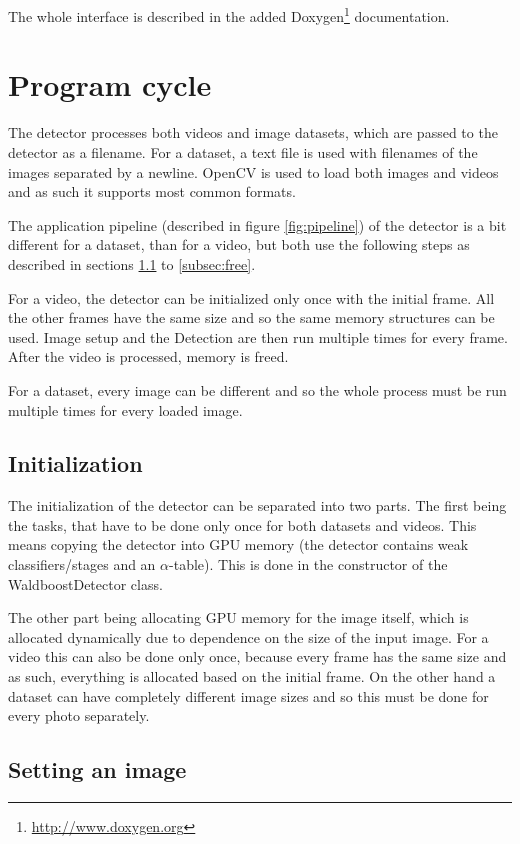 The whole interface is described in the added Doxygen\footnote{\url{http://www.doxygen.org}} documentation.

\section{Program cycle}

The detector processes both videos and image datasets, which are passed to the detector as a filename. For a dataset, a text file is used with filenames of the images separated by a newline. OpenCV is used to load both images and videos and as such it supports most common formats.

The application pipeline (described in figure \ref{fig:pipeline}) of the detector is a bit different for a dataset, than for a video, but both use the following steps as described in sections \ref{subsec:init} to \ref{subsec:free}.

For a video, the detector can be initialized only once with the initial frame. All the other frames have the same size and so the same memory structures can be used. Image setup and the Detection are then run multiple times for every frame. After the video is processed, memory is freed.

For a dataset, every image can be different and so the whole process must be run multiple times for every loaded image.

\subsection{Initialization}\label{subsec:init}

The initialization of the detector can be separated into two parts. The first being the tasks, that have to be done only once for both datasets and videos. This means copying the detector into GPU memory (the detector contains weak classifiers/stages and an $\alpha$-table). This is done in the constructor of the WaldboostDetector class.

The other part being allocating GPU memory for the image itself, which is allocated dynamically due to dependence on the size of the input image. For a video this can also be done only once, because every frame has the same size and as such, everything is allocated based on the initial frame. On the other hand a dataset can have completely different image sizes and so this must be done for every photo separately.

\subsection{Setting an image}

